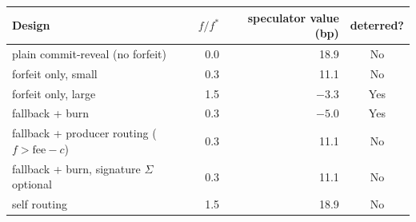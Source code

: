 \begin{tabular}{|l|r|r|c|}
\hline
\rowcolor{gray!15}Design & $f/f^*$ & speculator value (bp) & deterred? \\
\hline
plain commit-reveal (no forfeit) & 0.0 & 18.9 & No \\
\hline
forfeit only, small & 0.3 & 11.1 & No \\
\hline
forfeit only, large & 1.5 & $-3.3$ & Yes \\
\hline
fallback + burn & 0.3 & $-5.0$ & Yes \\
\hline
fallback + producer routing ($f>\mathrm{fee}-c$) & 0.3 & 11.1 & No \\
\hline
fallback + burn, signature $\Sigma$ optional & 0.3 & 11.1 & No \\
\hline
self routing & 1.5 & 18.9 & No \\
\hline
\end{tabular}
